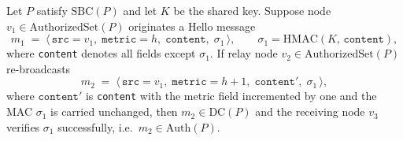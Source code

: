 
\begin{lemma}
\label{lem:relay-preserves-mac}
Let $P$ satisfy $\mathrm{SBC}(P)$ and let $K$ be the shared key.
Suppose node $v_1 \in \mathrm{AuthorizedSet}(P)$ originates a Hello message
\[
  m_1 \;=\; \langle\, \texttt{src}=v_1,\; \texttt{metric}=h,\;
                       \texttt{content},\; \sigma_1 \,\rangle,
  \qquad
  \sigma_1 = \mathrm{HMAC}(K,\, \texttt{content}),
\]
where \texttt{content} denotes all fields except $\sigma_1$.
If relay node $v_2 \in \mathrm{AuthorizedSet}(P)$ re-broadcasts
\[
  m_2 \;=\; \langle\, \texttt{src}=v_1,\; \texttt{metric}=h+1,\;
                       \texttt{content}',\; \sigma_1 \,\rangle,
\]
where $\texttt{content}'$ is \texttt{content} with the metric field
incremented by one and the MAC $\sigma_1$ is carried unchanged,
then $m_2 \in \mathrm{DC}(P)$ and the receiving node $v_3$ verifies
$\sigma_1$ successfully, i.e.\ $m_2 \in \mathrm{Auth}(P)$.
\end{lemma}

